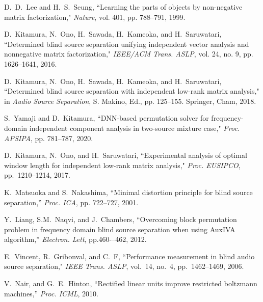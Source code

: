 \documentclass[honka]{nitkagawathesis}%
\begin{document}
\begin{thebibliography}{99}
  D.~D.~Lee and H.~S.~Seung, ``Learning the parts of objects by non-negative matrix factorization," {\em Nature}, vol. 401, pp. 788--791, 1999.
  
  D.~Kitamura, N.~Ono, H.~Sawada, H.~Kameoka, and H.~Saruwatari, ``Determined blind source separation unifying independent vector analysis and nonnegative matrix factorization,"  {\em IEEE/ACM Trans. ASLP}, vol. 24, no. 9, pp. 1626--1641, 2016.
  
  D.~Kitamura, N.~Ono, H.~Sawada, H.~Kameoka, and H.~Saruwatari, ``Determined blind source separation with independent low-rank matrix analysis," in  {\em Audio Source Separation}, S. Makino, Ed., pp. 125--155. Springer, Cham, 2018.
  
  S.~Yamaji and D.~Kitamura, ``DNN-based permutation solver for frequency-domain independent component analysis in two-source mixture case," {\em  Proc. APSIPA}, pp. 781–787, 2020.
  
  D.~Kitamura, N.~Ono, and H.~Saruwatari, ``Experimental analysis of optimal window length for independent low-rank matrix analysis,"  {\em Proc. EUSIPCO}, pp.~1210--1214, 2017.
  
  
  K.~Matsuoka and S.~Nakashima, ``Minimal distortion principle for blind source separation,'' {\em Proc. ICA}, pp. 722--727, 2001.
  
  Y.~Liang, S.M.~Naqvi, and J.~Chambers, ``Overcoming block permutation
  problem in frequency domain blind source separation when using
  AuxIVA algorithm,'' {\em Electron. Lett}, pp.460-–462, 2012.
  
  E.~Vincent, R.~Gribonval, and C.~F, ``Performance measurement in blind audio source separation," {\em IEEE Trans. ASLP}, vol.~14, no.~4, pp.~1462--1469, 2006.
  
  V.~Nair, and G.~E.~Hinton, ``Rectified linear units improve restricted boltzmann machines,'' 
  {\em Proc. ICML}, 2010.
  

\end{thebibliography}
\end{document}
